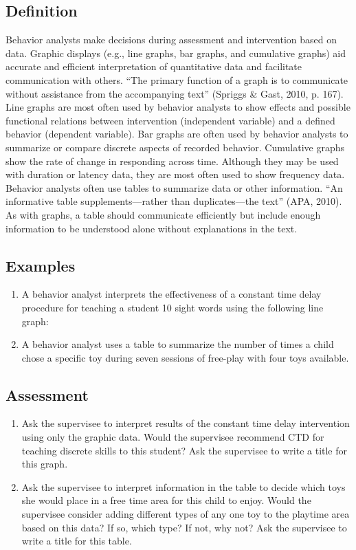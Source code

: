 \subsection{Definition}
Behavior analysts make decisions during assessment and intervention based on data. Graphic displays (e.g., line graphs, bar graphs, and cumulative graphs) aid accurate and efficient interpretation of quantitative data and facilitate communication with others. ``The primary function of a graph is to communicate without assistance from the accompanying text'' (Spriggs \& Gast, 2010, p. 167). Line graphs are most often used by behavior analysts to show effects and possible functional relations between intervention (independent variable) and a defined behavior (dependent variable). Bar graphs are often used by behavior analysts to summarize or compare discrete aspects of recorded behavior. Cumulative graphs show the rate of change in responding across time. Although they may be used with duration or latency data, they are most often used to show frequency data. Behavior analysts often use tables to summarize data or other information. ``An informative table supplements—rather than duplicates—the text'' (APA, 2010). As with graphs, a table should communicate efficiently but include enough information to be understood alone without explanations in the text.
%
\subsection{Examples}
\begin{enumerate}
\item A behavior analyst interprets the effectiveness of a constant time delay procedure for teaching a student 10 sight words using the following line graph: 
\item A behavior analyst uses a table to summarize the number of times a child chose a specific toy during seven sessions of free-play with four toys available. 
\end{enumerate}
%
\subsection{Assessment}
\begin{enumerate}
\item Ask the supervisee to interpret results of the constant time delay intervention using only the graphic data. Would the supervisee recommend CTD for teaching discrete skills to this student? Ask the supervisee to write a title for this graph.
\item Ask the supervisee to interpret information in the table to decide which toys she would place in a free time area for this child to enjoy. Would the supervisee consider adding different types of any one toy to the playtime area based on this data? If so, which type? If not, why not? Ask the supervisee to write a title for this table.
%
\end{enumerate}
%
